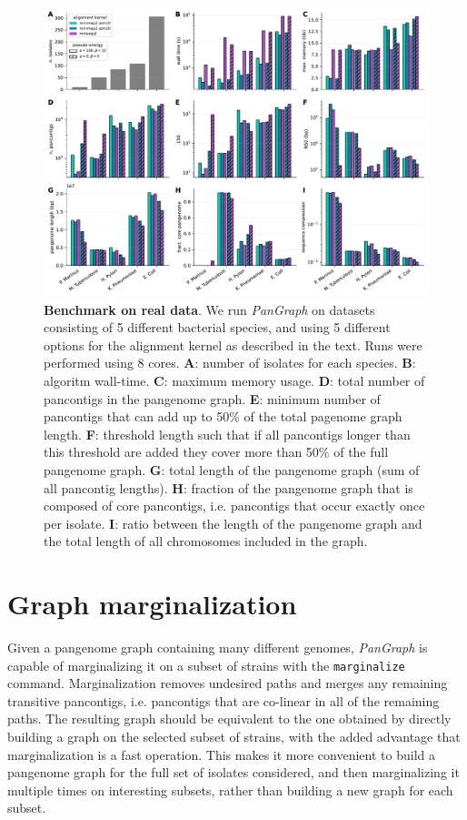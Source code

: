 \documentclass[aps,rmp,reprint,superscriptaddress,notitlepage,10pt,onecolumn]{revtex4-1}
\begin{document}
\begin{figure}[htb]
    \includegraphics[width=\textwidth]{figs_suppl/panx_benchmark_suppl.pdf}
    \caption{{\bf Benchmark on real data}. We run \textit{PanGraph} on datasets consisting of 5 different bacterial species, and using 5 different options for the alignment kernel as described in the text. Runs were performed using 8 cores.
        \textbf{A}: number of isolates for each species.
        \textbf{B}: algoritm wall-time.
        \textbf{C}: maximum memory usage.
        \textbf{D}: total number of pancontigs in the pangenome graph.
        \textbf{E}: minimum number of pancontigs that can add up to 50\% of the total pagenome graph length.
        \textbf{F}: threshold length such that if all pancontigs longer than this threshold are added they cover more than 50\% of the full pangenome graph.
        \textbf{G}: total length of the pangenome graph (sum of all pancontig lengths).
        \textbf{H}: fraction of the pangenome graph that is composed of core pancontigs, i.e. pancontigs that occur exactly once per isolate.
        \textbf{I}: ratio between the length of the pangenome graph and the total length of all chromosomes included in the graph.
    }
    \label{fig:panx-benchmark-suppl}
\end{figure}


\section{Graph marginalization}

Given a pangenome graph containing many different genomes, \textit{PanGraph} is capable of marginalizing it on a subset of strains with the \verb|marginalize| command. Marginalization removes undesired paths and merges any remaining transitive pancontigs, i.e. pancontigs that are co-linear in all of the remaining paths.
The resulting graph should be equivalent to the one obtained by directly building a graph on the selected subset of strains, with the added advantage that marginalization is a fast operation. This makes it more convenient to build a pangenome graph for the full set of isolates considered, and then marginalizing it multiple times on interesting subsets, rather than building a new graph for each subset.
\end{document}
